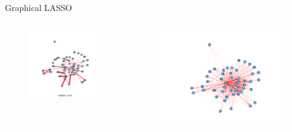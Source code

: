 \documentclass[12pt, trans]{beamer}
\newcommand{\1}[1]{{\mathbf 1}\left\{#1\right\}}        %
\begin{document}
\begin{frame}{Graphical LASSO}

 \begin{columns}[t]
 \begin{column}{0.5\textwidth}

\begin{figure}
  \centering
  \includegraphics[scale=0.25]{./../../gLassoResults/glasso1.png} 
\end{figure}

 \end{column}
 \begin{column}{0.5\textwidth}

\begin{figure}
  \centering
  \includegraphics[scale=0.25]{./../../coocurResults/cooccurNetwork.png} 
\end{figure}

 \end{column}
 \end{columns}

\end{frame}
\end{document}
